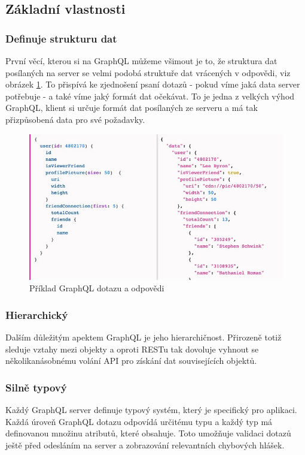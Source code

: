 \documentclass[thesis=M,czech]{FITthesis}[2019/12/23]
\begin{document}
\subsection{Základní vlastnosti}
\subsubsection*{Definuje strukturu dat}
První věcí, kterou si na GraphQL můžeme všimout je to, že struktura dat posílaných na server se velmi podobá struktuře dat vrácených v odpovědi, viz obrázek \ref{graphql-query}. To přispívá ke zjednošení psaní dotazů - pokud víme jaká data server potřebuje - a také víme jaký formát dat očekávat. To je jedna z velkých výhod GraphQL, klient si určuje formát dat posílaných ze serveru a má tak přizpůsobená data pro své požadavky.

\begin{figure}[h]
    \includegraphics[width=\linewidth]{img/graphql-query.png}
    \caption{Příklad GraphQL dotazu a odpovědi \cite{graphql_query_img}}
	\label{graphql-query}
\end{figure}

\subsubsection*{Hierarchický}
Dalším důležitým apektem GraphQL je jeho hierarchičnost. Přirozeně totiž sleduje vztahy mezi objekty a oproti RESTu tak dovoluje vyhnout se několikanásobnému volání API pro získání dat souvisejících objektů.

\subsubsection*{Silně typový}
Každý GraphQL server definuje typový systém, který je specifický pro aplikaci.
Každá úroveň GraphQL dotazu odpovídá určitému typu a každý typ má definovanou množinu atributů, které obsahuje. Toto umožňuje validaci dotazů ještě před odesláním na server a zobrazování relevantních chybových hlášek.
\end{document}
